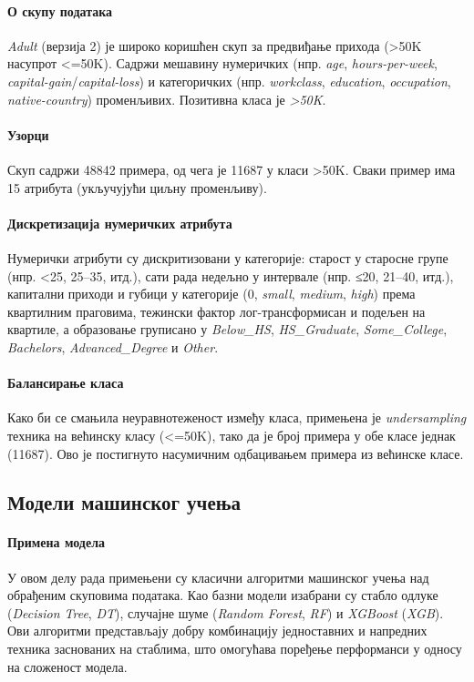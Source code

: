\paragraph{О скупу података} \emph{Adult} (верзија 2) је широко коришћен скуп за предвиђање прихода (>50K насупрот <=50K). Садржи мешавину нумеричких (нпр. \textit{age}, \textit{hours-per-week}, \textit{capital-gain}/\textit{capital-loss}) и категоричких (нпр. \textit{workclass}, \textit{education}, \textit{occupation}, \textit{native-country}) променљивих. Позитивна класа је \textit{>50K}.

\paragraph{Узорци} Скуп садржи 48842 примера, од чега је 11687 у класи >50K. Сваки пример има 15 атрибута (укључујући циљну променљиву).

\paragraph{Дискретизација нумеричких атрибута} Нумерички атрибути су дискритизовани у категорије: старост у старосне групе (нпр. <25, 25–35, итд.), сати рада недељно у интервале (нпр. ≤20, 21–40, итд.), капитални приходи и губици у категорије (0, \textit{small}, \textit{medium}, \textit{high}) према квартилним праговима, тежински фактор лог-трансформисан и подељен на квартиле, а образовање груписано у \textit{Below\_HS}, \textit{HS\_Graduate}, \textit{Some\_College}, \textit{Bachelors}, \textit{Advanced\_Degree} и \textit{Other}.

\paragraph{Балансирање класа} Како би се смањила неуравнотеженост између класа, примењена је \textit{undersampling} техника на већинску класу (<=50K), тако да је број примера у обе класе једнак (11687). Ово је постигнуто насумичним одбацивањем примера из већинске класе.

\subsection{Модели машинског учења}
\paragraph{Примена модела} У овом делу рада примењени су класични алгоритми машинског учења над обрађеним скуповима података. Као базни модели изабрани су стабло одлуке (\emph{Decision Tree}, \textit{DT}), случајне шуме (\emph{Random Forest}, \textit{RF}) и \emph{XGBoost} (\textit{XGB}). Ови алгоритми представљају добру комбинацију једноставних и напредних техника заснованих на стаблима, што омогућава поређење перформанси у односу на сложеност модела.

